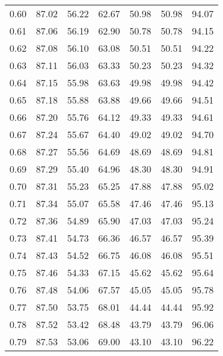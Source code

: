 \begin{tabular}{|c|c|c|c|c|c|c|}
      0.60 &     87.02 &     56.22 &      62.67 &   50.98 &      50.98 &         94.07 \\
      0.61 &     87.06 &     56.19 &      62.90 &   50.78 &      50.78 &         94.15 \\
      0.62 &     87.08 &     56.10 &      63.08 &   50.51 &      50.51 &         94.22 \\
      0.63 &     87.11 &     56.03 &      63.33 &   50.23 &      50.23 &         94.32 \\
      0.64 &     87.15 &     55.98 &      63.63 &   49.98 &      49.98 &         94.42 \\
      0.65 &     87.18 &     55.88 &      63.88 &   49.66 &      49.66 &         94.51 \\
      0.66 &     87.20 &     55.76 &      64.12 &   49.33 &      49.33 &         94.61 \\
      0.67 &     87.24 &     55.67 &      64.40 &   49.02 &      49.02 &         94.70 \\
      0.68 &     87.27 &     55.56 &      64.69 &   48.69 &      48.69 &         94.81 \\
      0.69 &     87.29 &     55.40 &      64.96 &   48.30 &      48.30 &         94.91 \\
      0.70 &     87.31 &     55.23 &      65.25 &   47.88 &      47.88 &         95.02 \\
      0.71 &     87.34 &     55.07 &      65.58 &   47.46 &      47.46 &         95.13 \\
      0.72 &     87.36 &     54.89 &      65.90 &   47.03 &      47.03 &         95.24 \\
      0.73 &     87.41 &     54.73 &      66.36 &   46.57 &      46.57 &         95.39 \\
      0.74 &     87.43 &     54.52 &      66.75 &   46.08 &      46.08 &         95.51 \\
      0.75 &     87.46 &     54.33 &      67.15 &   45.62 &      45.62 &         95.64 \\
      0.76 &     87.48 &     54.06 &      67.57 &   45.05 &      45.05 &         95.78 \\
      0.77 &     87.50 &     53.75 &      68.01 &   44.44 &      44.44 &         95.92 \\
      0.78 &     87.52 &     53.42 &      68.48 &   43.79 &      43.79 &         96.06 \\
      0.79 &     87.53 &     53.06 &      69.00 &   43.10 &      43.10 &         96.22 \\

\end{tabular}
